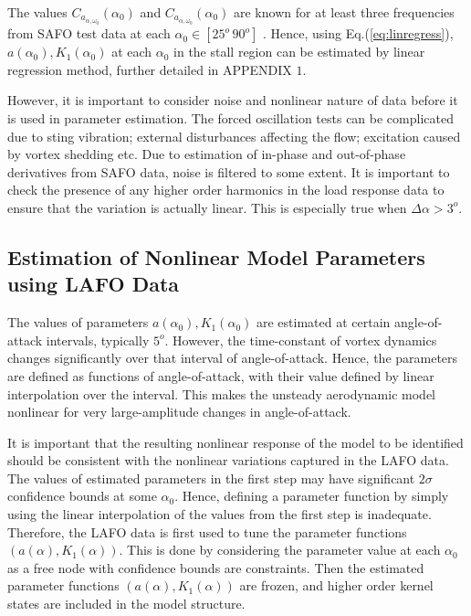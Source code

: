 \documentclass{AIAA}
\begin{document}
The values $C_{a_{\alpha,\omega_0}}(\alpha_0)$ and $C_{a_{\dot{\alpha},\omega_0}}(\alpha_0)$ are known for at least three frequencies from SAFO test data at each $\alpha_0 \in [25^o \, 90^o]$ . Hence, using Eq.(\ref{eq:linregress}), $a(\alpha_0),K_1(\alpha_0)$ at each $\alpha_0$ in the stall region can be estimated by linear regression method, further detailed in APPENDIX $1$.

However, it is important to consider noise and nonlinear nature of data before it is used in parameter estimation. The forced oscillation tests can be complicated due to sting vibration; external disturbances affecting the flow; excitation caused by vortex shedding etc. Due to estimation of in-phase and out-of-phase derivatives from SAFO data, noise is filtered to some extent. It is important to check the presence of any higher order harmonics in the load response data to ensure that the variation is actually linear. This is especially true when $\Delta \alpha >3^o$.

\subsection{Estimation of Nonlinear Model Parameters using LAFO Data}
The values of parameters $a(\alpha_0),K_1(\alpha_0)$ are estimated at certain angle-of-attack intervals, typically $5^o$. However, the time-constant of vortex dynamics changes significantly over that interval of angle-of-attack. Hence, the parameters are defined as functions of angle-of-attack, with their value defined by linear interpolation over the interval. This makes the unsteady aerodynamic model nonlinear for very large-amplitude changes in angle-of-attack. 

It is important that the resulting nonlinear response of the model to be identified should be consistent with the nonlinear variations captured in the LAFO data. The values of estimated parameters in the first step may have significant $2 \sigma$ confidence bounds at some $\alpha_0$. Hence, defining a parameter function by simply using the linear interpolation of the values from the first step is inadequate. Therefore, the LAFO data is first used to tune the parameter functions $(a(\alpha),K_1(\alpha))$. This is done by considering the parameter value at each $\alpha_0$ as a free node with confidence bounds are constraints. Then the estimated parameter functions $(a(\alpha),K_1(\alpha))$ are frozen, and higher order kernel states are included in the model structure. 
\end{document}
